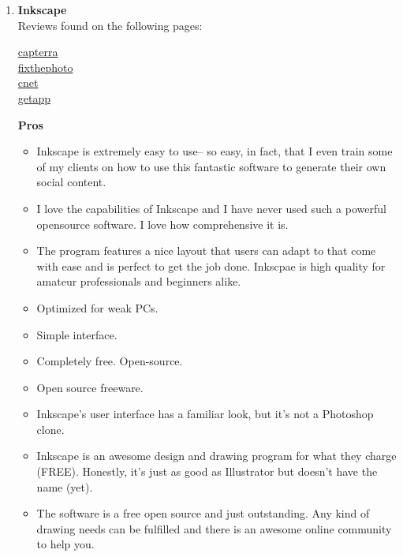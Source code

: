 \documentclass[a4paper,12pt]{article}
\begin{document}
\begin{enumerate}
\item \textbf{Inkscape}\\
  Reviews found on the following pages:
  \begin{center}
    \href{https://www.capterra.com/p/178240/Inkscape/}{capterra}\\
    \href{https://fixthephoto.com/inkscape-review.html}{fixthephoto}\\
    \href{https://download.cnet.com/Inkscape/3000-2191_4-10527269.html}{cnet}\\
    \href{https://www.getapp.com/collaboration-software/a/inkscape-business-graphics-software/reviews/}{getapp}\\
  \end{center}

  \textbf{Pros}
  \begin{itemize}
  \item Inkscape is extremely easy to use-- so easy, in fact, that I even train some of my clients on how to use this fantastic software to generate their own social content.
  \item I love the capabilities of Inkscape and I have never used such a powerful opensource software. I love how comprehensive it is.
  \item The program features a nice layout that users can adapt to that come with ease and is perfect to get the job done. Inkscpae is high quality for amateur professionals and beginners alike.
  \item Optimized for weak PCs.
  \item Simple interface.
  \item Completely free. Open-source.
  \item Open source freeware.
  \item Inkscape's user interface has a familiar look, but it's not a Photoshop clone.
  \item Inkscape is an awesome design and drawing program for what they charge (FREE). Honestly, it's just as good as Illustrator but doesn't have the name (yet).
  \item The software is a free open source and just outstanding. Any kind of drawing needs can be fulfilled and there is an awesome online community to help you.
  \end{itemize}
  

\end{enumerate}
\end{document}
